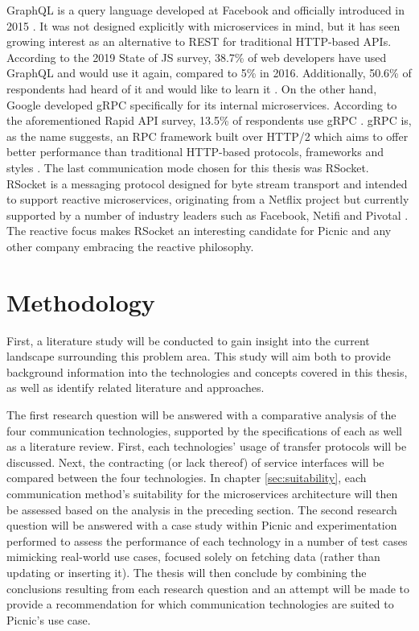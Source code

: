 GraphQL is a query language developed at Facebook and officially introduced in 2015 \cite{schrock2015blog}. It was not designed explicitly with microservices in mind, but it has seen growing interest as an alternative to REST for traditional HTTP-based APIs. According to the 2019 State of JS survey, 38.7\% of web developers have used GraphQL and would use it again, compared to 5\% in 2016. Additionally, 50.6\% of respondents had heard of it and would like to learn it \cite{stateofjs}. On the other hand, Google developed gRPC specifically for its internal microservices. According to the aforementioned Rapid API survey, 13.5\% of respondents use gRPC \cite{rapid2020survey}. gRPC is, as the name suggests, an RPC framework built over HTTP/2 which aims to offer better performance than traditional HTTP-based protocols, frameworks and styles \cite{aboutgrpc}. The last communication mode chosen for this thesis was RSocket. RSocket is a messaging protocol designed for byte stream transport and intended to support reactive microservices, originating from a Netflix project but currently supported by a number of industry leaders such as Facebook, Netifi and Pivotal \cite{netifi2017rsocket}. The reactive focus makes RSocket an interesting candidate for Picnic and any other company embracing the reactive philosophy.

\section{Methodology}
First, a literature study will be conducted to gain insight into the current landscape surrounding this problem area. This study will aim both to provide background information into the technologies and concepts covered in this thesis, as well as identify related literature and approaches.

The first research question will be answered with a comparative analysis of the four communication technologies, supported by the specifications of each as well as a literature review. First, each technologies' usage of transfer protocols will be discussed. Next, the contracting (or lack thereof) of service interfaces will be compared between the four technologies. In chapter \ref{sec:suitability}, each communication method's suitability for the microservices architecture will then be assessed based on the analysis in the preceding section. The second research question will be answered with a case study within Picnic and experimentation performed to assess the performance of each technology in a number of test cases mimicking real-world use cases, focused solely on fetching data (rather than updating or inserting it). The thesis will then conclude by combining the conclusions resulting from each research question and an attempt will be made to provide a recommendation for which communication technologies are suited to Picnic's use case.

